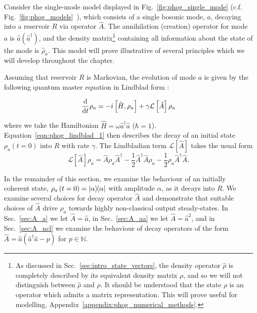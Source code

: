 Consider the single-mode model displayed in Fig.~\ref{fig:phog_single_mode} (c.f. Fig.~\ref{fig:phog_models}~\MakeUppercase{}), which consists of a single bosonic mode, $a$, decaying into a reservoir $R$ via operator $\hat{A}$. The annihilation (creation) operator for mode $a$ is $\hat{a} \left(\hat{a}^\dagger\right)$, and the density matrix\footnote{As discussed in Sec.~\ref{sec:intro_state_vectors}, the density operator $\hat{\rho}$ is completely described by its equivalent density matrix $\rho$, and so we will not distinguish between $\hat{\rho}$ and $\rho$. It should be understood that the state $\rho$ is an operator which admits a matrix representation. This will prove useful for modelling, Appendix~\ref{appendix:phog_numerical_methods}.} containing all information about the state of the mode is $\hat{\rho}_a$. This model will prove illustrative of several principles which we will develop throughout the chapter. 

Assuming that reservoir $R$ is Markovian, the evolution of mode $a$ is given by the following quantum master equation in Lindblad form \cite{Carmichael1999a, Breuer2002}:


\begin{equation}\label{eqn:phog_lindblad_1}
\frac{\mathrm{d}}{\mathrm{d}t} \rho_a =  - i \left[\hat{H}, \rho_a\right] + \gamma \mathcal{L}\left[\hat{A}\right]\rho_a
\end{equation}

\noindent where we take the Hamiltonian $\hat{H} =  \omega \hat{a}^\dagger \hat{a}$ ($\hbar = 1$). Equation~\ref{eqn:phog_lindblad_1} then describes the decay of an initial state $\rho_a\left(t=0\right)$ into $R$ with rate $\gamma$. The Lindbladian term $\mathcal{L}\left[\hat{A}\right]$ takes the usual form %
\begin{equation}\label{eqn:phog_lindbladian_form}
\mathcal{L}\left[\hat{A}\right]\rho_a = \hat{A}\rho_a\hat{A}^\dagger - \frac{1}{2} \hat{A}^\dagger \hat{A} \rho_a - \frac{1}{2} \rho_a \hat{A}^\dagger \hat{A}.
\end{equation}

\noindent In the remainder of this section, we examine the behaviour of an initially coherent state, $\rho_a\left(t=0\right) = \dyad{\alpha}$ with amplitude $\alpha$, as it decays into $R$. We examine several choices for decay operator $\hat{A}$ and demonstrate that suitable choices of $\hat{A}$ drive $\rho_a$ towards highly non-classical output steady-states. In Sec.~\ref{sec:A_a} we let $\hat{A} = \hat{a}$, in Sec.~\ref{sec:A_aa} we let $\hat{A} = \hat{a}^2$, and in Sec.~\ref{sec:A_ncl} we examine the behaviour of decay operators of the form $\hat{A} = \hat{a} \left(\hat{a}^\dagger \hat{a} - p\right)$ for $p \in \mathbb{N}$.



